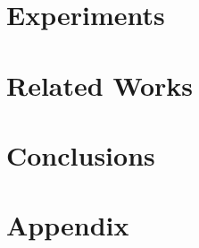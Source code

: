 \documentclass[10pt]{article}
\begin{document}
\newpage
\section{Experiments}
    \label{sec:experiments}
    
    
\newpage
\section{Related Works}
    \label{sec:related}
        

\section{Conclusions}
    \label{sec:conclusions}
    





\newpage
\appendix
\section{Appendix}

\end{document}
